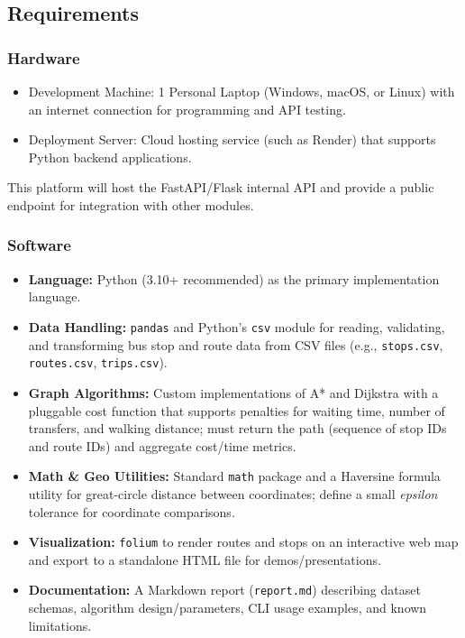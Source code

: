 \subsection{Requirements}
\subsubsection{Hardware}
\begin{itemize}
    \item Development Machine: 1 Personal Laptop (Windows, macOS, or Linux) with an internet connection for programming and API testing.
    \item Deployment Server: Cloud hosting service (such as Render) that supports Python backend applications.
\end{itemize}
This platform will host the FastAPI/Flask internal API and provide a public endpoint for integration with other modules.

\subsubsection{Software}
\begin{itemize}
  \item \textbf{Language:} Python (3.10+ recommended) as the primary implementation language.
  \item \textbf{Data Handling:} \texttt{pandas} and Python's \texttt{csv} module for reading, validating, and transforming bus stop and route data from CSV files (e.g., \texttt{stops.csv}, \texttt{routes.csv}, \texttt{trips.csv}).
  \item \textbf{Graph Algorithms:} Custom implementations of A* and Dijkstra with a pluggable cost function that supports penalties for waiting time, number of transfers, and walking distance; must return the path (sequence of stop IDs and route IDs) and aggregate cost/time metrics.
  \item \textbf{Math \& Geo Utilities:} Standard \texttt{math} package and a Haversine formula utility for great-circle distance between coordinates; define a small \emph{epsilon} tolerance for coordinate comparisons.
  \item \textbf{Visualization:} \texttt{folium} to render routes and stops on an interactive web map and export to a standalone HTML file for demos/presentations.
  \item \textbf{Documentation:} A Markdown report (\texttt{report.md}) describing dataset schemas, algorithm design/parameters, CLI usage examples, and known limitations.
\end{itemize}


